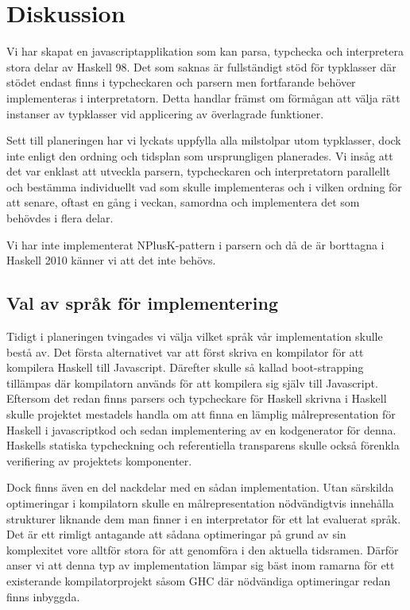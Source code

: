\section{Diskussion}
Vi har skapat en javascriptapplikation som kan parsa, typchecka och interpretera stora delar av Haskell 98. Det som saknas är fullständigt stöd för typklasser där stödet endast finns i typcheckaren och parsern men fortfarande behöver implementeras i interpretatorn. Detta handlar främst om förmågan att välja rätt instanser av typklasser vid applicering av överlagrade funktioner.

Sett till planeringen har vi lyckats uppfylla alla milstolpar utom typklasser, dock inte enligt den ordning och tidsplan som ursprungligen planerades. 
Vi insåg att det var enklast att utveckla parsern, typcheckaren och interpretatorn parallellt och bestämma individuellt vad som skulle implementeras och i 
vilken ordning för att senare, oftast en gång i veckan, samordna och implementera det som behövdes i flera delar.

Vi har inte implementerat NPlusK-pattern i parsern och då de är borttagna i Haskell 2010 \citep{haskell2010} känner vi att det inte behövs.

\subsection{Val av språk för implementering}
Tidigt i planeringen tvingades vi välja vilket språk vår implementation skulle
bestå av. Det första alternativet var att först skriva en kompilator för att
kompilera Haskell till Javascript. Därefter skulle så kallad boot-strapping
tillämpas där kompilatorn används för att kompilera sig själv till
Javascript. Eftersom det redan finns parsers och typcheckare för Haskell
skrivna i Haskell skulle projektet mestadels handla om att finna en lämplig
målrepresentation för Haskell i javascriptkod och sedan implementering av en
kodgenerator för denna. Haskells statiska typcheckning och referentiella
transparens skulle också förenkla verifiering av projektets komponenter.

Dock finns även en del nackdelar med en sådan implementation. Utan särskilda
optimeringar i kompilatorn skulle en målrepresentation nödvändigtvis innehålla
strukturer liknande dem man finner i en interpretator för ett lat evaluerat
språk. Det är ett rimligt antagande att sådana optimeringar på grund av sin komplexitet vore alltför stora för att genomföra i den aktuella tidsramen. Därför anser vi att denna typ av implementation lämpar sig bäst inom
ramarna för ett existerande kompilatorprojekt såsom GHC där nödvändiga optimeringar redan finns inbyggda.

